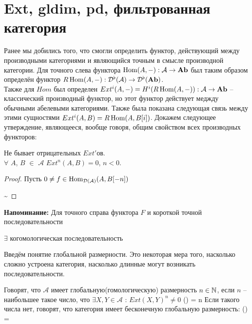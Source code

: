 \documentclass[../main.tex]{subfiles}
\begin{document}
\section{Ext, gldim, pd, фильтрованная категория}
Ранее мы добились того, что смогли определить функтор, действующий между производными категориями и являющийся точным в смысле производной категории. 
Для точного слева функтора $\operatorname{Hom}(A, -) : \mathcal{A} \rightarrow \mathbf{Ab}$ был таким образом определён функтор $R\operatorname{Hom}(A, -) : \mathcal{D^\flat (A)} \rightarrow \mathcal{D^\flat (\mathbf{Ab})}$.\\
Также для $Hom$ был определен $Ext^i(A, -) = H^i(R\operatorname{Hom}(A, -)) : \mathcal{A} \rightarrow \mathbf{Ab}$ -- классический производный функтор, но этот функтор действует меджду обычными абелевыми категориями. Также была показана следующая связь между этими сущностями $Ext^i(A, B) = R\operatorname{Hom}(A, B[i])$.
Докажем следующее утверждение, являющееся, вообще говоря, общим свойством всех производных функторов:
\begin{to_claim}
Не бывает отрицательных $Ext'$ов.\\
$\forall$ $A$, $B$ $\in$ $\mathcal{A}$ $Ext^n (A, B) = 0$, $n<0$.
\begin{proof}
Пусть $0 \neq f \in \operatorname{Hom}_{\mathcal{D(A)}}(A, B[-n])$
\bee
{}
\sim\text{ }
\eee
\end{proof}
\end{to_claim}
\textbf{Напоминание:} Для точного справа функтора $F$ и короткой точной последовательности  $\exists$ когомологическая последовательность 
Введём понятие глобальной размерности. Это некоторая мера того, насколько сложно устроена категория, насколько длинные могут возникать последовательности.
\begin{to_def}
\label{gld}
Говорят, что $\mathcal{A}$ имеет глобальную(гомологическую) размерность $n\in \mathbb{N}$, если $n$ -- наибольшее такое число, что $\exists X, Y \in \mathcal{A}$ : $Ext(X, Y)^n \neq 0$
\bee
{}() = n
\eee
Если такого числа нет, говорят, что категория имеет бесконечную глобальную размерность:
\bee
{}() = \infty
\eee
\end{to_def}
\end{document}
